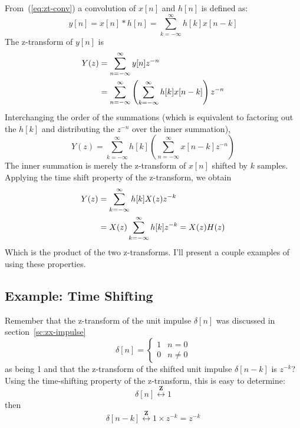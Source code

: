 From~(\ref{eq:zt-conv}) a convolution of $x[n]$ and $h[n]$ is defined as:
\begin{equation}
y[n] = x[n] \ast h[n] = \sum_{k=-\infty}^{\infty} h[k] x[n-k]
\end{equation}
The z-transform of $y[n]$ is 
\begin{align}
Y(z) &= \sum_{n=-\infty}^{\infty} y[n]z^{-n} \notag\\
     &= \sum_{n=-\infty}^{\infty}
     \left( \sum_{k=-\infty}^{\infty} h[k] x[n-k] \right)z^{-n}
\end{align}
Interchanging the order of the summations (which is equivalent to
factoring out the $h[k]$ and distributing the $z^{-n}$ over the inner
summation),
\begin{equation}
Y(z) = \sum_{k=-\infty}^{\infty} h[k]
             \left( \sum_{n=-\infty}^{\infty} x[n-k] z^{-n} \right)
\end{equation}
The inner summation is merely the z-transform of $x[n]$ shifted by $k$
samples.  Applying the time shift property of the z-transform, we
obtain
\begin{align}
Y(z) &= \sum_{k=-\infty}^{\infty} h[k] X(z) z^{-k} \notag\\
     &= X(z)\sum_{k=-\infty}^{\infty} h[k] z^{-k} 
     = X(z) H(z)
\end{align}
Which is the product of the two z-transforms. I'll present a couple
examples of using these properties.

\subsection{Example: Time Shifting}

Remember that the z-transform of the unit impulse
$\delta[n]$ was discussed in section~\ref{sc:zx-impulse}
\begin{equation}
\delta[n] = \left\{\begin{array}{ll}
                        1 & n=0 \\
                        0 & n \neq 0
          \end{array}\right.
\end{equation}
as being 1 and that the z-transform of the shifted unit impulse
$\delta[n-k]$ is $z^{-k}$? Using the time-shifting property of the
z-transform, this is easy to determine:
\begin{equation}
\delta[n]\stackrel{\mathbf{Z}}{\longleftrightarrow} 1
\end{equation}
then 
\begin{equation}
\delta[n-k]\stackrel{\mathbf{Z}}{\longleftrightarrow} 1 \times z^{-k}=z^{-k}
\end{equation}

